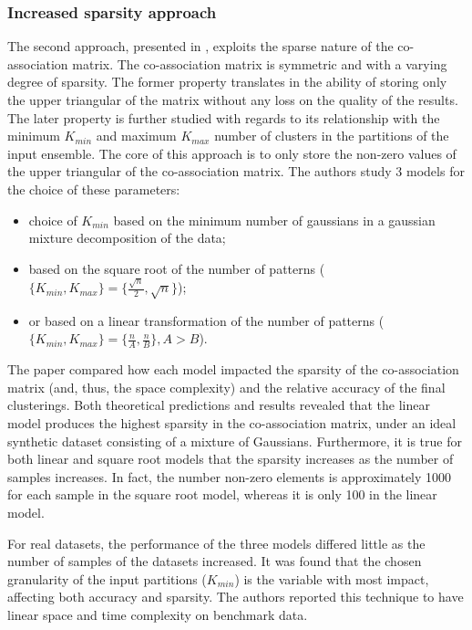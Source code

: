 \subsubsection{Increased sparsity approach}
The second approach, presented in \cite{Lourenco2010}, exploits the sparse nature of the co-association matrix. The co-association matrix is symmetric and with a varying degree of sparsity. The former property translates in the ability of storing only the upper triangular of the matrix without any loss on the quality of the results. The later property is further studied with regards to its relationship with the minimum $K_{min}$ and maximum $K_{max}$ number of clusters in the partitions of the input ensemble. The core of this approach is to only store the non-zero values of the upper triangular of the co-association matrix. The authors study 3 models for the choice of these parameters:

\begin{itemize}
	\item choice of $K_{min}$ based on the minimum number of gaussians in a gaussian mixture decomposition of the data;
	\item based on the square root of the number of patterns ($\{K_{min},K_{max}\} = \{\frac{\sqrt{n}}{2},\sqrt{n}\}$);
	\item or based on a linear transformation of the number of patterns ($\{K_{min},K_{max}\} = \{\frac{n}{A},\frac{n}{B}\},A>B$).
\end{itemize}

The paper compared how each model impacted the sparsity of the co-association matrix (and, thus, the space complexity) and the relative accuracy of the final clusterings. Both theoretical predictions and results revealed that the linear model produces the highest sparsity in the co-association matrix, under an ideal synthetic dataset consisting of a mixture of Gaussians. Furthermore, it is true for both linear and square root models that the sparsity increases as the number of samples increases. In fact, the number non-zero elements is approximately 1000 for each sample in the square root model, whereas it is only 100 in the linear model.

For real datasets, the performance of the three models differed little as the number of samples of the datasets increased. It was found that the chosen granularity of the input partitions ($K_{min}$) is the variable with most impact, affecting both accuracy and sparsity. The authors reported this technique to have linear space and time complexity on benchmark data.

